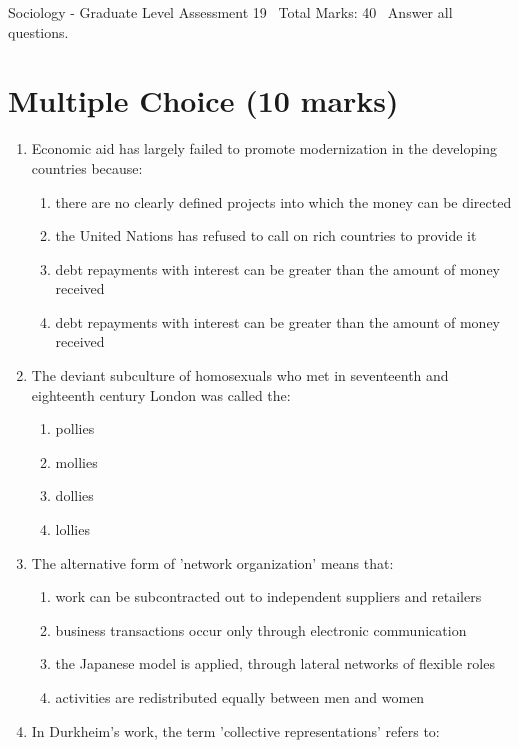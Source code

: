\documentclass[12pt]{article}
\begin{document}
\begin{center}
Sociology - Graduate Level Assessment 19 \
Total Marks: 40 \
Answer all questions.
\end{center}

\section*{Multiple Choice (10 marks)}
\begin{enumerate}[label=\arabic*.]
\item Economic aid has largely failed to promote modernization in the developing countries because:
\begin{enumerate}[label=(\alph*)]
    \item there are no clearly defined projects into which the money can be directed
    \item the United Nations has refused to call on rich countries to provide it
    \item debt repayments with interest can be greater than the amount of money received
    \item debt repayments with interest can be greater than the amount of money received
\end{enumerate}
\item The deviant subculture of homosexuals who met in seventeenth and eighteenth century London was called the:
\begin{enumerate}[label=(\alph*)]
    \item pollies
    \item mollies
    \item dollies
    \item lollies
\end{enumerate}
\item The alternative form of 'network organization' means that:
\begin{enumerate}[label=(\alph*)]
    \item work can be subcontracted out to independent suppliers and retailers
    \item business transactions occur only through electronic communication
    \item the Japanese model is applied, through lateral networks of flexible roles
    \item activities are redistributed equally between men and women
\end{enumerate}
\item In Durkheim's work, the term 'collective representations' refers to:

\end{enumerate}
\end{document}
